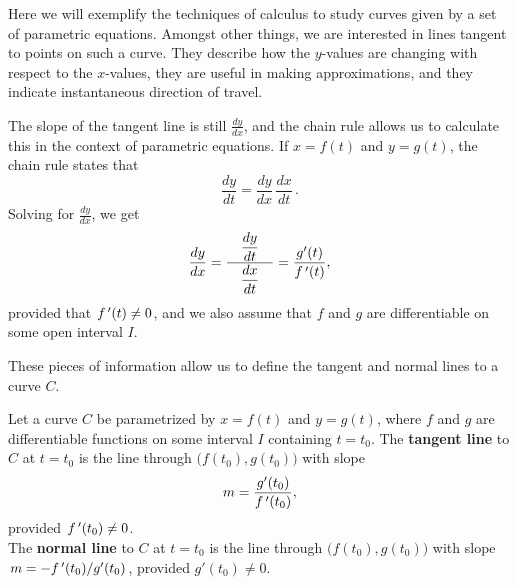  \ifcourse
 	\checkoddpage
{}
 \fi
Here we will exemplify the techniques of calculus to study curves given by a set of parametric equations. Amongst other things, we are interested in lines tangent to points on such a curve. They describe how the $y$-values are changing with respect to the $x$-values, they are useful in making approximations, and they indicate instantaneous direction of travel.

The slope of the tangent line is still $\frac{dy}{dx}$, and the chain rule allows us to calculate this in the context of parametric equations. If $x=f(t)$ and $y=g(t)$, the chain rule states that $$\frac{dy}{dt} = \frac{dy}{dx}\,\frac{dx}{dt}\,.$$
Solving for $\frac{dy}{dx}$, we get 
\begin{equation}
\frac{dy}{dx} = \dfrac{\quad\dfrac{dy}{dt}\quad}{\dfrac{dx}{dt}} = \frac{g'(t)}{f\,'(t)},
\label{idea:dydxpar}
\end{equation}
provided that $f\,'(t)\neq 0$, and we also assume that $f$ and $g$ are differentiable on some open interval $I$. 

These pieces of information allow us to define the tangent and normal lines to a curve $C$.

\begin{definition}\label{def:tangent_par}
Let a curve $C$ be parametrized by $x=f(t)$ and $y=g(t)$, where $f$ and $g$ are differentiable functions on some interval $I$ containing $t=t_0$. The \textbf{tangent line} to $C$ at $t=t_0$ is the line through $\big(f(t_0),g(t_0)\big)$ with slope $$m=\dfrac{g'(t_0)}{f\,'(t_0)},$$
provided $f\,'(t_0)\neq 0$.\\

The \textbf{normal line} to $C$ at $t=t_0$ is the line through $\big(f(t_0),g(t_0)\big)$ with slope $m=-f\,'(t_0)/g'(t_0)$, provided $g'(t_0)\neq 0$.
\end{definition}

